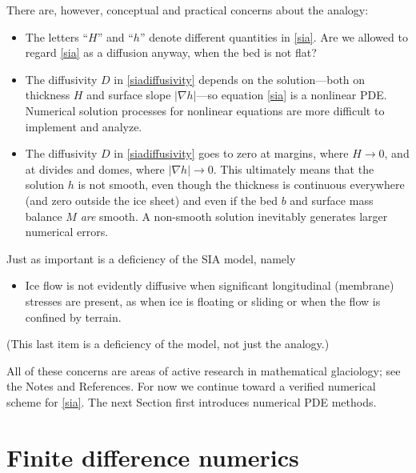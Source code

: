 \documentclass[letterpaper,final,12pt,reqno]{amsart}
\newcommand{\grad}{\nabla}
\begin{document}
There are, however, conceptual and practical concerns about the analogy:
\begin{itemize}
\item The letters ``$H$'' and ``$h$'' denote different quantities in \eqref{sia}.  Are we allowed to regard \eqref{sia} as a diffusion anyway, when the bed is not flat?
\item The diffusivity $D$ in \eqref{siadiffusivity} depends on the solution---both on thickness $H$ and surface slope $|\grad h|$---so equation \eqref{sia} is a nonlinear PDE.  Numerical solution processes for nonlinear equations are more difficult to implement and analyze.
\item The diffusivity $D$ in \eqref{siadiffusivity} goes to zero at margins, where $H\to 0$, and at divides and domes, where $|\grad h|\to 0$.  This ultimately means that the solution $h$ is not smooth, even though the thickness is continuous everywhere (and zero outside the ice sheet) and even if the bed $b$ and surface mass balance $M$ \emph{are} smooth.  A non-smooth solution inevitably generates larger numerical errors.
\end{itemize}
Just as important is a deficiency of the SIA model, namely
\begin{itemize}
\item Ice flow is not evidently diffusive when significant longitudinal (membrane) stresses are present, as when ice is floating or sliding or when the flow is confined by terrain.
\end{itemize}
(This last item is a deficiency of the model, not just the analogy.)

All of these concerns are areas of active research in mathematical glaciology; see the Notes and References.  For now we continue toward a verified numerical scheme for \eqref{sia}.  The next Section first introduces numerical PDE methods.


\section{Finite difference numerics}  \label{sec:fd}
\end{document}
